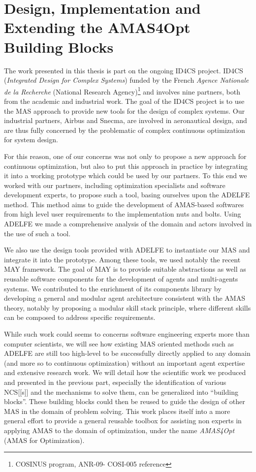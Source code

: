\part{Design, Implementation and Extending the AMAS4Opt Building Blocks}

The work presented in this thesis is part on the ongoing ID4CS project. ID4CS (\emph{Integrated Design for Complex Systems}) funded by the French \emph{Agence Nationale de la Recherche} (National Research Agency)\footnote{COSINUS program, ANR-09-
COSI-005 reference} and involves nine partners, both from the academic and industrial work. The goal of the ID4CS project is to use the MAS approach to provide new tools for the design of complex systems. Our industrial partners, Airbus and Snecma, are involved in aeronautical design, and are thus fully concerned by the problematic of complex continuous optimization for system design.

For this reason, one of our concerns was not only to propose a new approach for continuous optimization, but also to put this approach in practice by integrating it into a working prototype which could be used by our partners. To this end we worked with our partners, including optimization specialists and software development experts, to propose such a tool, basing ourselves upon the ADELFE method. This method aims to guide the development of AMAS-based softwares from high level user requirements to the implementation nuts and bolts. Using ADELFE we made a comprehensive analysis of the domain and actors involved in the use of such a tool.

We also use the design tools provided with ADELFE to instantiate our MAS and integrate it into the prototype. Among these tools, we used notably the recent MAY framework. The goal of MAY is to provide suitable abstractions as well as reusable software components for the development of agents and multi-agents systems. We contributed to the enrichment of its components library by developing a general and modular agent architecture consistent with the AMAS theory, notably by proposing a modular skill stack principle, where different skills can be composed to address specific requirements.

While such work could seems to concerns software engineering experts more than computer scientists, we will see how existing MAS oriented methods such as ADELFE are still too high-level to be successfully directly applied to any domain (and more so to continuous optimization) without an important agent expertise and extensive research work. We will detail how the scientific work we produced and presented in the previous part, especially the identification of various NCS[[s]] and the mechanisms to solve them, can be generalized into \enquote{building blocks}. These building blocks could then be reused to guide the design of other MAS in the domain of problem solving. This work places itself into a more general effort to provide a general reusable toolbox for assisting non experts in applying AMAS to the domain of optimization, under the name \emph{AMAS4Opt} (AMAS for Optimization).

